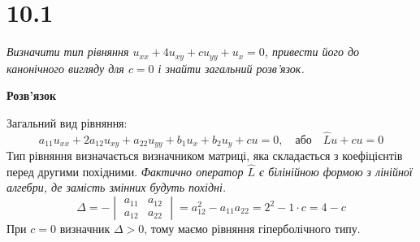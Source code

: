 


%


\section[Задача №10.1]{10.1}

\textit{Визначити тип рівняння $u_{xx} + 4u_{xy} + cu_{yy} + u_x = 0$, привести його до канонічного вигляду для $c = 0$ і знайти загальний розв’язок.}

\begin{center}
    \large{\textbf{Розв'язок}}
\end{center}

Загальний вид рівняння:
\begin{equation}
    a_{11}u_{xx} + 2a_{12}u_{xy} + a_{22}u_{yy} + b_1u_x + b_2u_y + cu = 0, \quad \text{або} \quad \hat{L}u + cu = 0
\end{equation}
Тип рівняння визначається визначником матриці, яка складається з коефіцієнтів перед другими похідними. \textit{Фактично оператор $\hat{L}$ є білінійною формою з лінійної алгебри, де замість змінних будуть похідні.}
\begin{equation}
    \Delta = -
    \begin{vmatrix}
        a_{11} & a_{12}\\
        a_{12} & a_{22}
    \end{vmatrix} 
    = a_{12}^2 - a_{11}a_{22} = 2^2 - 1\cdot c = 4 - c 
\end{equation}
При $c = 0$ визначник $\Delta > 0$, тому маємо рівняння гіперболічного типу. 

